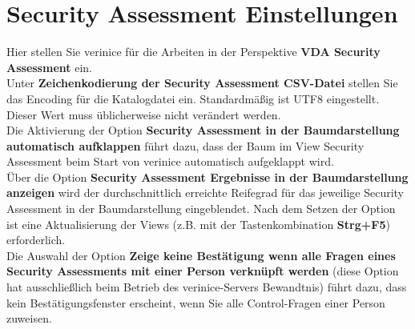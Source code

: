 \documentclass[a4paper,10pt]{book}
\begin{document}
\section{Security Assessment Einstellungen}
Hier stellen Sie verinice für die Arbeiten in der Perspektive \textbf{VDA Security Assessment} ein.
\newline\\
Unter \textbf{Zeichenkodierung der Security Assessment CSV-Datei} stellen Sie das Encoding für die Katalogdatei ein. Standardmäßig ist UTF8 eingestellt.
Dieser Wert muss üblicherweise nicht verändert werden.
\newline\\
Die Aktivierung der Option \textbf{Security Assessment in der Baumdarstellung automatisch aufklappen} führt dazu, dass der Baum im View Security Assessment
beim Start von verinice automatisch aufgeklappt wird.
\newline\\
Über die Option \textbf{Security Assessment Ergebnisse in der Baumdarstellung anzeigen} wird der durchschnittlich erreichte Reifegrad für das jeweilige Security Assessment
in der Baumdarstellung eingeblendet. Nach dem Setzen der Option ist eine Aktualisierung der Views
(z.B. mit der Tastenkombination \textbf{Strg+F5}) erforderlich.
\newline\\
Die Auswahl der Option \textbf{Zeige keine Bestätigung wenn alle Fragen eines Security Assessments mit einer Person verknüpft werden}
(diese Option hat ausschließlich beim Betrieb des verinice-Servers Bewandtnis) führt dazu, dass kein Bestätigungsfenster erscheint, wenn Sie alle
Control-Fragen einer Person zuweisen.
\end{document}
